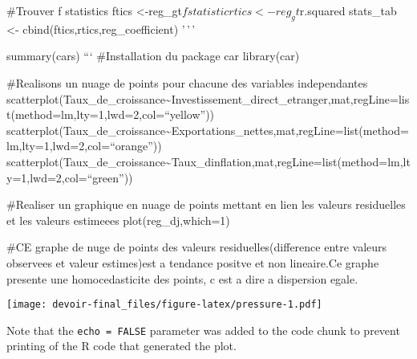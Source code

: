 \documentclass[
]{article}
\begin{document}
\#Trouver f statistics ftics
\textless-reg\_gt\(fstatistic rtics <-reg_gt\)r.squared stats\_tab
\textless- cbind(ftics,rtics,reg\_coefficient) '\,'\,'

summary(cars) ``` \#Installation du package car library(car)

\#Realisons un nuage de points pour chacune des variables independantes
scatterplot(Taux\_de\_croissance\textasciitilde Investissement\_direct\_etranger,mat,regLine=list(method=lm,lty=1,lwd=2,col=``yellow''))
scatterplot(Taux\_de\_croissance\textasciitilde Exportations\_nettes,mat,regLine=list(method=lm,lty=1,lwd=2,col=``orange''))
scatterplot(Taux\_de\_croissance\textasciitilde Taux\_dinflation,mat,regLine=list(method=lm,lty=1,lwd=2,col=``green''))

\#Realiser un graphique en nuage de points mettant en lien les valeurs
residuelles et les valeurs estimeees plot(reg\_dj,which=1)

\#CE graphe de nuge de points des valeurs residuelles(difference entre
valeurs observees et valeur estimes)est a tendance positve et non
lineaire.Ce graphe presente une homocedasticite des points, c est a dire
a dispersion egale.

\texttt{[image: devoir-final\_files/figure-latex/pressure-1.pdf]}

Note that the \texttt{echo\ =\ FALSE} parameter was added to the code
chunk to prevent printing of the R code that generated the plot.
\end{document}
